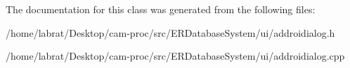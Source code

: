 The documentation for this class was generated from the following files\+:\begin{DoxyCompactItemize}
\item 
/home/labrat/\+Desktop/cam-\/proc/src/\+E\+R\+Database\+System/ui/addroidialog.\+h\item 
/home/labrat/\+Desktop/cam-\/proc/src/\+E\+R\+Database\+System/ui/addroidialog.\+cpp\end{DoxyCompactItemize}
